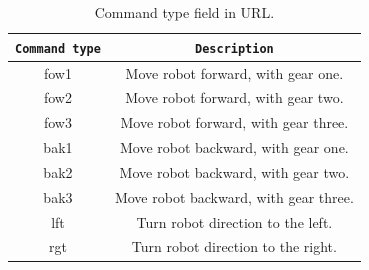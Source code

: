 \begin{table}[!h]
  \centering  
  \begin{tabular}{| c | c |}

    \hline
    \texttt{\bf Command type} &
    \texttt{\bf Description} \\ %

    \hline
    \parbox[t]{6.5cm}{\raggedright \small fow1 } &
    \parbox[t]{6cm}{\raggedright \small
      Move robot forward, with gear one.} \\  [1ex]

    \hline
    \parbox[t]{6.5cm}{\raggedright \small fow2 } &
    \parbox[t]{6cm}{\raggedright \small
      Move robot forward, with gear two.} \\  [1ex]
    \hline
    \parbox[t]{6.5cm}{\raggedright \small fow3 } &
    \parbox[t]{6cm}{\raggedright \small
      Move robot forward, with gear three.} \\  [1ex]

    \hline
    \parbox[t]{6.5cm}{\raggedright \small bak1 } &
    \parbox[t]{6cm}{\raggedright \small
      Move robot backward, with gear one.} \\  [1ex]

    \hline
    \parbox[t]{6.5cm}{\raggedright \small bak2 } &
    \parbox[t]{6cm}{\raggedright \small
      Move robot backward, with gear two.} \\  [1ex]
    \hline
    \parbox[t]{6.5cm}{\raggedright \small bak3 } &
    \parbox[t]{6cm}{\raggedright \small
      Move robot backward, with gear three.} \\  [1ex]

    \hline
    \parbox[t]{6.5cm}{\raggedright \small lft } &
    \parbox[t]{6cm}{\raggedright \small
      Turn robot direction to the left.} \\  [1ex]

    \hline
    \parbox[t]{6.5cm}{\raggedright \small rgt } &
    \parbox[t]{6cm}{\raggedright \small
      Turn robot direction to the right.} \\  [1ex]

    \hline

  \end{tabular}
  \caption{Command type field in URL.}
  \label{table:command_type}
\end{table}

